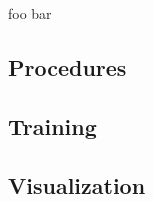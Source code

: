 foo bar

\subsection{\label{sec::ImplementationProcedures}Procedures}

\subsection{\label{sec::ImplementationTraining}Training}

\subsection{\label{sec::ImplementationVisualization}Visualization}
